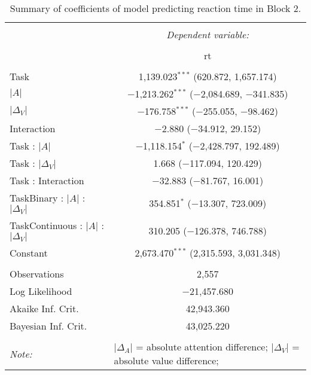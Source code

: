 
\begin{table}[t] \centering 
  \caption{Summary of coefficients of model predicting reaction time in Block 2.} 
  \label{table:rtModelBlock2} 
\begin{tabular}{@{\extracolsep{5pt}}lc} 
\\[-1.8ex]\hline 
\hline \\[-1.8ex] 
 & \multicolumn{1}{c}{\textit{Dependent variable:}} \\ 
\cline{2-2} 
\\[-1.8ex] & rt \\ 
\hline \\[-1.8ex] 
 Task & 1,139.023$^{***}$ (620.872, 1,657.174) \\ 
  $\vert A \vert$ & $-$1,213.262$^{***}$ ($-$2,084.689, $-$341.835) \\ 
  $\vert\Delta_V\vert$ & $-$176.758$^{***}$ ($-$255.055, $-$98.462) \\ 
  Interaction & $-$2.880 ($-$34.912, 29.152) \\ 
  Task : $\vert A \vert$ & $-$1,118.154$^{*}$ ($-$2,428.797, 192.489) \\ 
  Task : $\vert\Delta_V\vert$ & 1.668 ($-$117.094, 120.429) \\ 
  Task : Interaction & $-$32.883 ($-$81.767, 16.001) \\ 
  TaskBinary : $\vert A \vert$ :  $\vert\Delta_V\vert$ & 354.851$^{*}$ ($-$13.307, 723.009) \\ 
  TaskContinuous : $\vert A \vert$ :  $\vert\Delta_V\vert$ & 310.205 ($-$126.378, 746.788) \\ 
  Constant & 2,673.470$^{***}$ (2,315.593, 3,031.348) \\ 
 \hline \\[-1.8ex] 
Observations & 2,557 \\ 
Log Likelihood & $-$21,457.680 \\ 
Akaike Inf. Crit. & 42,943.360 \\ 
Bayesian Inf. Crit. & 43,025.220 \\ 
\hline 
\hline \\[-1.8ex] 
\textit{Note:}  & \multicolumn{1}{l}{\footnotesize $\vert\Delta_A\vert$ = absolute attention difference; $\vert\Delta_V\vert$ = absolute value difference; } \\ 
\end{tabular} 
\end{table} 

